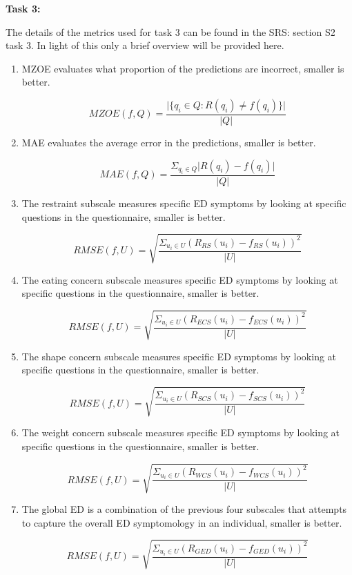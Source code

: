 \documentclass[12pt, titlepage]{article}
\begin{document}
\noindent \textbf{Task 3:}

The details of the metrics used for task 3 can be found in the SRS: section S2 task 3. In light of this only a brief overview will be provided here.

\begin{enumerate}

\item MZOE evaluates what proportion of the predictions are incorrect, smaller is better.

$$MZOE(f,Q) = \frac{\vert\{q_i \in Q : R(q_i) \neq f(q_i)\}\vert}{\vert Q \vert}$$

\item MAE evaluates the average error in the predictions, smaller is better.

$$MAE(f,Q) = \frac{\Sigma_{q_i \in Q}\vert R(q_i) - f(q_i)\vert}{\vert Q \vert}$$

\item The restraint subscale measures specific ED symptoms by looking at specific questions in the questionnaire, smaller is better.

$$RMSE(f,U) = \sqrt{\frac{\Sigma_{u_i \in U}(R_{RS}(u_i) - f_{RS}(u_i))^2}{\vert U \vert}}$$

\item The eating concern subscale measures specific ED symptoms by looking at specific questions in the questionnaire, smaller is better.

$$RMSE(f,U) = \sqrt{\frac{\Sigma_{u_i \in U}(R_{ECS}(u_i) - f_{ECS}(u_i))^2}{\vert U \vert}}$$

\item The shape concern subscale measures specific ED symptoms by looking at specific questions in the questionnaire, smaller is better.

$$RMSE(f,U) = \sqrt{\frac{\Sigma_{u_i \in U}(R_{SCS}(u_i) - f_{SCS}(u_i))^2}{\vert U \vert}}$$

\item The weight concern subscale measures specific ED symptoms by looking at specific questions in the questionnaire, smaller is better.

$$RMSE(f,U) = \sqrt{\frac{\Sigma_{u_i \in U}(R_{WCS}(u_i) - f_{WCS}(u_i))^2}{\vert U \vert}}$$

\item The global ED is a combination of the previous four subscales that attempts to capture the overall ED symptomology in an individual, smaller is better.

$$RMSE(f,U) = \sqrt{\frac{\Sigma_{u_i \in U}(R_{GED}(u_i) - f_{GED}(u_i))^2}{\vert U \vert}}$$

\end{enumerate}
\end{document}
